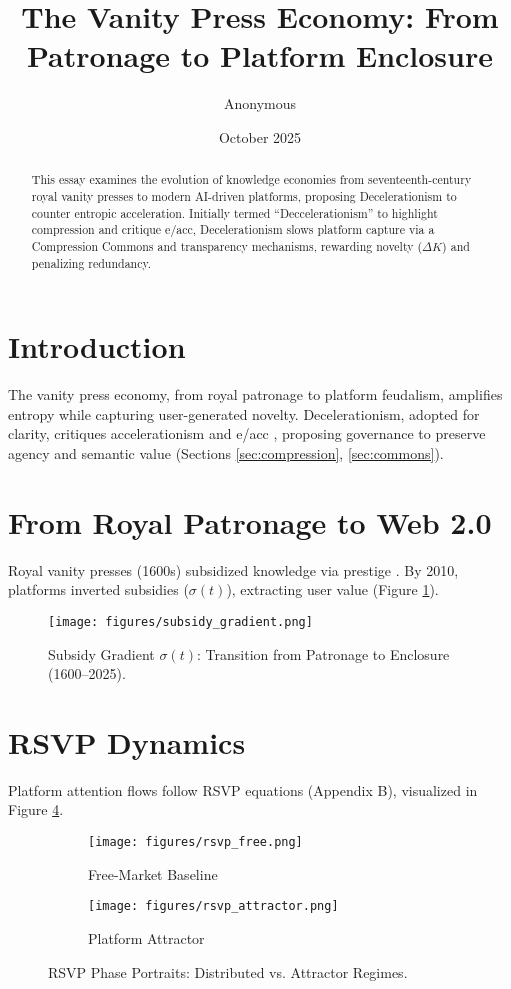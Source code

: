 \documentclass[11pt]{article}
\title{The Vanity Press Economy: From Patronage to Platform Enclosure}
\author{Anonymous}
\date{October 2025}
\begin{document}
\maketitle

\begin{abstract}
This essay examines the evolution of knowledge economies from seventeenth-century royal vanity presses to modern AI-driven platforms, proposing \gls{Decelerationism} to counter entropic acceleration. Initially termed ``Deccelerationism'' to highlight compression and critique \gls{e/acc}, \gls{Decelerationism} slows platform capture via a Compression Commons and transparency mechanisms, rewarding novelty (\(\Delta K\)) and penalizing redundancy.
\end{abstract}

\section{Introduction}
The vanity press economy, from royal patronage to platform feudalism, amplifies entropy while capturing user-generated novelty. \gls{Decelerationism}, adopted for clarity, critiques accelerationism and \gls{e/acc} \citep{BasedBeffJezos2023}, proposing governance to preserve agency and semantic value (Sections \ref{sec:compression}, \ref{sec:commons}).

\section{From Royal Patronage to Web 2.0}
\label{sec:history}
Royal vanity presses (1600s) subsidized knowledge via prestige \citep{Biagioli2002}. By 2010, platforms inverted subsidies (\(\sigma(t)\)), extracting user value (Figure \ref{fig:subsidy}).

\begin{figure}[h]
\centering
\texttt{[image: figures/subsidy\_gradient.png]}
\caption{Subsidy Gradient $\sigma(t)$: Transition from Patronage to Enclosure (1600–2025).}
\label{fig:subsidy}
\end{figure}

\section{RSVP Dynamics}
\label{sec:rsvp}
Platform attention flows follow RSVP equations (Appendix B), visualized in Figure \ref{fig:rsvp}.

\begin{figure}[h]
\centering
\begin{subfigure}{0.45\textwidth}
\texttt{[image: figures/rsvp\_free.png]}
\caption{Free-Market Baseline}
\label{fig:rsvp_free}
\end{subfigure}
\hfill
\begin{subfigure}{0.45\textwidth}
\texttt{[image: figures/rsvp\_attractor.png]}
\caption{Platform Attractor}
\label{fig:rsvp_attractor}
\end{subfigure}
\caption{RSVP Phase Portraits: Distributed vs. Attractor Regimes.}
\label{fig:rsvp}
\end{figure}
\end{document}

